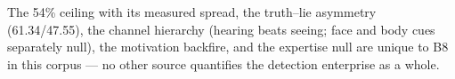 \begin{unique}
  \item The 54\% ceiling with its measured spread, the truth--lie asymmetry (61.34/47.55), the channel hierarchy (hearing beats seeing; face and body cues separately null), the motivation backfire, and the expertise null are unique to B8 in this corpus --- no other source quantifies the detection enterprise as a whole.
\end{unique}
